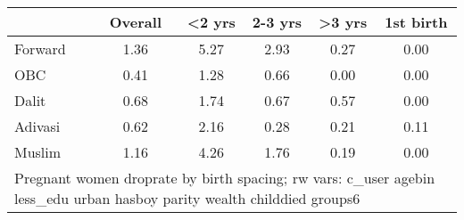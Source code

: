 \begin{tabular}{l*{5}{c}}
\toprule
            &\multicolumn{1}{c}{Overall}&\multicolumn{1}{c}{<2 yrs}&\multicolumn{1}{c}{2-3 yrs}&\multicolumn{1}{c}{>3 yrs}&\multicolumn{1}{c}{1st birth}\\
\midrule
\midrule
Forward     &        1.36&        5.27&        2.93&        0.27&        0.00\\
OBC         &        0.41&        1.28&        0.66&        0.00&        0.00\\
Dalit       &        0.68&        1.74&        0.67&        0.57&        0.00\\
Adivasi     &        0.62&        2.16&        0.28&        0.21&        0.11\\
Muslim      &        1.16&        4.26&        1.76&        0.19&        0.00\\
\bottomrule
\multicolumn{6}{l}{\footnotesize Pregnant women droprate by birth spacing; rw vars: c\_user agebin less\_edu urban hasboy parity wealth childdied groups6}\\
\end{tabular}
